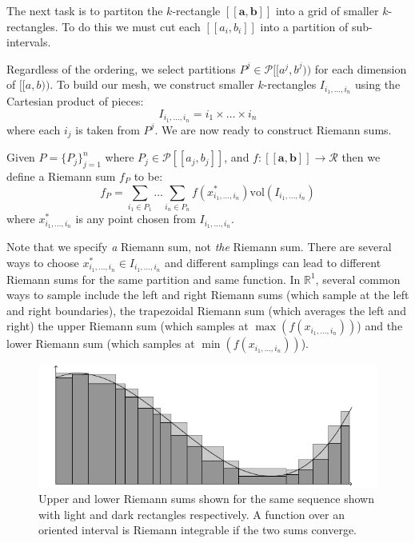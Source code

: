The next task is to partiton the $k$-rectangle $[\![\boldsymbol{a}, \boldsymbol{b}]\!]$ into a grid of smaller
$k$-rectangles.
To do this we must cut each $[\![a_i, b_i]\!]$ into a partition of sub-intervals. 




Regardless of the ordering, we select partitions $P^j \in \mathcal{P}[\![a^j,b^j)\!)$ for each dimension of $[\![a,b)\!)$.
To build our mesh, we construct smaller $k$-rectangles $I_{i_1, \ldots, i_n}$ using the Cartesian product of pieces:
\begin{equation}
	I_{i_1, \ldots, i_n} = i_1 \times \ldots \times i_n
\end{equation}
where each $i_j$ is taken from $P^j$.
We are now ready to construct Riemann sums.

\begin{definition}
	Given $P=\{ P_j \}_{j=1}^n$ where $P_j \in \mathcal{P}[\![a_j, b_j]\!]$,
	and $f:[\![\boldsymbol{a}, \boldsymbol{b}]\!] \to \mathcal{R}$ then we define a Riemann sum $f_P$ to be:
	\begin{equation}
		f_P = \sum_{i_1 \in P_1} \ldots \sum_{i_n \in P_n} f(x^*_{i_1, \ldots, i_n}) \text{vol}(I_{i_1, \ldots, i_n})
	\end{equation}
	where $x^*_{i_1, \ldots, i_n}$ is any point chosen from $I_{i_1, \ldots, i_n}$.
\end{definition}

Note that we specify \emph{a} Riemann sum, not \emph{the} Riemann sum.
There are several ways to choose $x^*_{i_1,\ldots,i_n} \in I_{i_1, \ldots, i_n}$ and different samplings can lead to different Riemann sums for the same partition and same function.
In $\mathbb{R}^1$, several common ways to sample include the left and right Riemann sums (which sample at the left and right boundaries), the trapezoidal Riemann sum (which averages the left and right) the upper Riemann sum (which samples at $\max(f(x_{i_1, \ldots, i_n}))$) and the lower Riemann sum (which samples at $\min(f(x_{i_1,\ldots,i_n}))$).


\begin{figure}[ht]
\caption[Riemann Integral]{Upper and lower Riemann sums shown for the same sequence shown with light and dark rectangles respectively. A function over an oriented interval is Riemann integrable if the two sums converge.}
\centering
\includegraphics[scale=0.6]{diagrams/riemann}
\end{figure}



